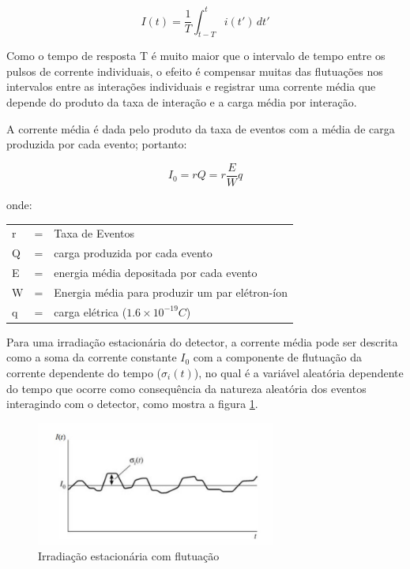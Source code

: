 \documentclass[11pt,a4paper]{article}
\begin{document}
				\begin{equation}
					I(t) = \frac{1}{T} \int_{t-T}^{t} i (t') \,dt' 
				\end{equation}

			\noindent Como o tempo de resposta T é muito maior que o intervalo de tempo entre os pulsos de corrente individuais, o efeito é compensar muitas das flutuações nos intervalos entre as interações individuais e registrar uma corrente média que depende do produto da taxa de interação e a carga média por interação.

			A corrente média é dada pelo produto da taxa de eventos com a média de carga produzida por cada evento; portanto:

				\begin{equation}
					I_0 = rQ = r\frac{E}{W}q
				\end{equation}
			
			\noindent onde:

				\begin{tabular}{l l l }
				r & = & Taxa de Eventos \\
				Q & = & carga produzida por cada evento \\
				E & = & energia média depositada por cada evento \\
				W & = & Energia média para produzir um par elétron-íon \\
				q & = & carga elétrica ($1.6 \times 10^{-19}C$)
				\end{tabular}

			Para uma irradiação estacionária do detector, a corrente média pode ser descrita como a soma da corrente constante $I_0$ com a componente de flutuação da corrente dependente do tempo ($\sigma_i(t)$), no qual é a variável aleatória dependente do tempo que ocorre como consequência da natureza aleatória dos eventos interagindo com o detector,  como mostra a figura \ref{fig:esquemaCorrenteFlutuacao}.

			\begin{figure}[h]
				\centering
				\includegraphics[width=0.7\textwidth]{Imagens/esquemaCorrenteFlutuação.jpg}
				\caption{Irradiação estacionária com flutuação}
				\label{fig:esquemaCorrenteFlutuacao}
			\end{figure}
\end{document}
